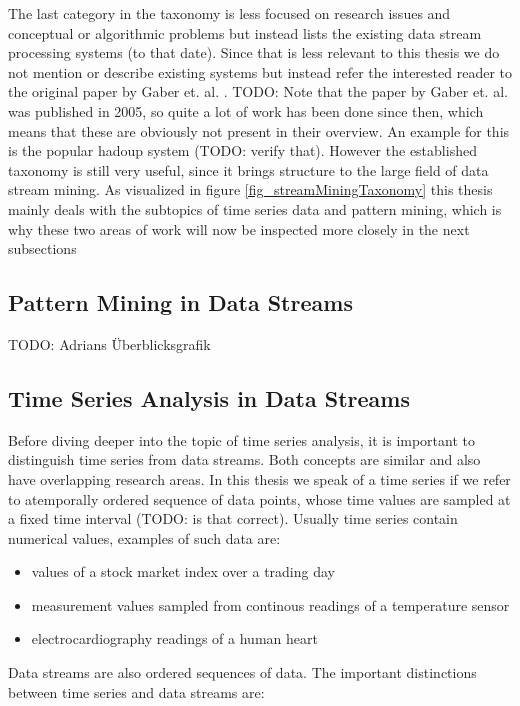 The last category in the taxonomy is less focused on research issues and conceptual or algorithmic problems but instead lists the existing data stream processing systems (to that date). Since that is less relevant to this thesis we do not mention or describe existing systems but instead refer the interested reader to the original paper by Gaber et. al. \cite{gaber2005mining}. \newline
TODO: Note that the paper by Gaber et. al. was published in 2005, so quite a lot of work has been done since then, which means that these are obviously not present in their overview. An example for this is the popular hadoup system (TODO: verify that). However the established taxonomy is still very useful, since it brings structure to the large field of data stream mining. \newline
As visualized in figure \ref{fig_streamMiningTaxonomy} this thesis mainly deals with the subtopics of time series data and pattern mining, which is why these two areas of work will now be inspected more closely in the next subsections

\subsection{Pattern Mining in Data Streams}
TODO: Adrians Überblicksgrafik

\subsection{Time Series Analysis in Data Streams}
Before diving deeper into the topic of time series analysis, it is important to distinguish time series from data streams. Both concepts are similar and also have overlapping research areas. In this thesis we speak of a time series if we refer to atemporally ordered sequence of data points, whose time values are sampled at a fixed time interval (TODO: is that correct). Usually time series contain numerical values, examples of such data are:

\begin{itemize}
	\item values of a stock market index over a trading day
	\item measurement values sampled from continous readings of a temperature sensor
	\item electrocardiography readings of a human heart
\end{itemize}

Data streams are also ordered sequences of data. The important distinctions between time series and data streams are: 

